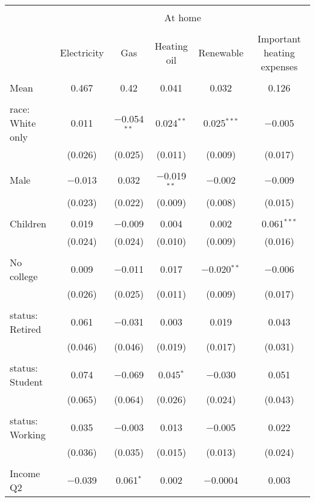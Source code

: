 
\begin{tabular}{@{\extracolsep{5pt}}lccccc} 
\\[-1.8ex]\hline 
\hline \\[-1.8ex] 
 & \multicolumn{5}{c}{At home} \\ 
\cline{2-6} 
\\[-1.8ex] & Electricity & Gas & Heating oil & Renewable & Important heating expenses \\ 
\hline \\[-1.8ex] 
 Mean & 0.467 & 0.42 & 0.041 & 0.032 & 0.126  \\ \hline \\[-1.8ex] race: White only & 0.011 & $-$0.054$^{**}$ & 0.024$^{**}$ & 0.025$^{***}$ & $-$0.005 \\ 
  & (0.026) & (0.025) & (0.011) & (0.009) & (0.017) \\ 
  & & & & & \\ 
 Male & $-$0.013 & 0.032 & $-$0.019$^{**}$ & $-$0.002 & $-$0.009 \\ 
  & (0.023) & (0.022) & (0.009) & (0.008) & (0.015) \\ 
  & & & & & \\ 
 Children & 0.019 & $-$0.009 & 0.004 & 0.002 & 0.061$^{***}$ \\ 
  & (0.024) & (0.024) & (0.010) & (0.009) & (0.016) \\ 
  & & & & & \\ 
 No college & 0.009 & $-$0.011 & 0.017 & $-$0.020$^{**}$ & $-$0.006 \\ 
  & (0.026) & (0.025) & (0.011) & (0.009) & (0.017) \\ 
  & & & & & \\ 
 status: Retired & 0.061 & $-$0.031 & 0.003 & 0.019 & 0.043 \\ 
  & (0.046) & (0.046) & (0.019) & (0.017) & (0.031) \\ 
  & & & & & \\ 
 status: Student & 0.074 & $-$0.069 & 0.045$^{*}$ & $-$0.030 & 0.051 \\ 
  & (0.065) & (0.064) & (0.026) & (0.024) & (0.043) \\ 
  & & & & & \\ 
 status: Working & 0.035 & $-$0.003 & 0.013 & $-$0.005 & 0.022 \\ 
  & (0.036) & (0.035) & (0.015) & (0.013) & (0.024) \\ 
  & & & & & \\ 
 Income Q2 & $-$0.039 & 0.061$^{*}$ & 0.002 & $-$0.0004 & 0.003 \\ 

\end{tabular}
